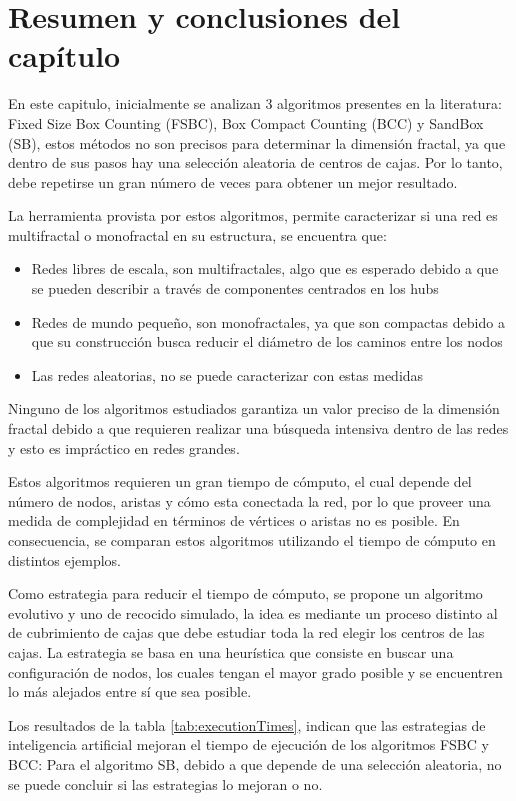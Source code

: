 \newpage
\section{Resumen y conclusiones del capítulo}

En este capitulo, inicialmente se analizan 3 algoritmos presentes en la literatura: Fixed Size Box Counting (FSBC), Box Compact Counting (BCC) y SandBox (SB), estos métodos no son precisos para determinar la dimensión fractal, ya que dentro de sus pasos hay una selección aleatoria de centros de cajas. Por lo tanto, debe repetirse un gran número de veces para obtener un mejor resultado.

La herramienta provista por estos algoritmos, permite caracterizar si una red es multifractal o monofractal en su estructura, se encuentra que:

\begin{itemize}
    \item Redes libres de escala, son multifractales, algo que es esperado debido a que se pueden describir a través de componentes centrados en los hubs
    \item Redes de mundo pequeño, son monofractales, ya que son compactas debido a que su construcción busca reducir el diámetro de los caminos entre los nodos
    \item Las redes aleatorias, no se puede caracterizar con estas medidas
\end{itemize}

Ninguno de los algoritmos estudiados garantiza un valor preciso de la dimensión fractal debido a que requieren realizar una búsqueda intensiva dentro de las redes y esto es impráctico en redes grandes.

Estos algoritmos requieren un gran tiempo de cómputo, el cual depende del número de nodos, aristas y cómo esta conectada la red, por lo que proveer una medida de complejidad en términos de vértices o aristas no es posible. En consecuencia, se comparan estos algoritmos utilizando el tiempo de cómputo en distintos ejemplos.

Como estrategia para reducir el tiempo de cómputo, se propone un algoritmo evolutivo y uno de recocido simulado, la idea es mediante un proceso distinto al de cubrimiento de cajas que debe estudiar toda la red elegir los centros de las cajas. La estrategia se basa en una heurística que consiste en buscar una configuración de nodos, los cuales tengan el mayor grado posible y se encuentren lo más alejados entre sí que sea posible.

Los resultados de la tabla \ref{tab:executionTimes}, indican que las estrategias de inteligencia artificial mejoran el tiempo de ejecución de los algoritmos FSBC y BCC: Para el algoritmo SB, debido a que depende de una selección aleatoria, no se puede concluir si las estrategias lo mejoran o no.